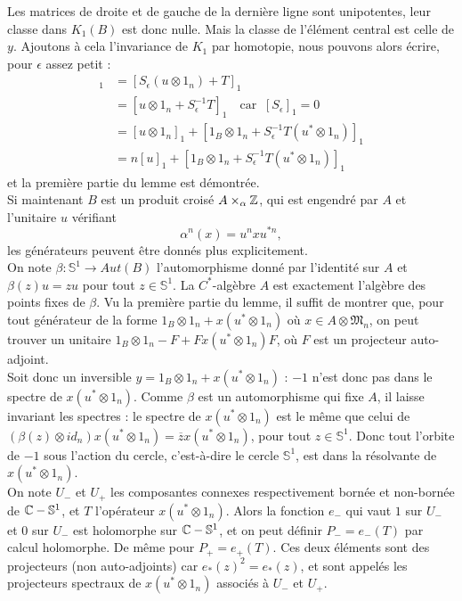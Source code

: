 \begin{dem}
Les matrices de droite et de gauche de la dernière ligne sont unipotentes, leur classe dans $K_1(B)$ est donc nulle. Mais la classe de l'élément central est celle de $y$. Ajoutons à cela l'invariance de $K_1$ par homotopie, nous pouvons alors écrire, pour $\epsilon$ assez petit :
\begin{align*}[y]_1 & =[S_\epsilon(u\otimes 1_n)+T]_1
	\\		&= [u\otimes 1_n +S_\epsilon^{-1}T]_1 \quad \text{car } \ [S_\epsilon]_1=0	
	\\ 		&=[u\otimes 1_n]_1+[1_B\otimes 1_n +S_\epsilon^{-1}T(u^*\otimes 1_n)]_1
	\\		&=n[u]_1+[1_B\otimes 1_n +S_\epsilon^{-1}T(u^*\otimes 1_n)]_1
\end{align*}
et la première partie du lemme est démontrée.\\

Si maintenant $B$ est un produit croisé $A\times_\alpha \mathbb Z$, qui est engendré par $A$ et l'unitaire $u$ vérifiant 
\[\alpha^n(x)=u^n x u^{*n},\]
les générateurs peuvent être donnés plus explicitement.\\

On note $\beta : \mathbb S^1 \rightarrow  Aut(B)$ l'automorphisme donné par l'identité sur $A$ et $\beta(z)u=zu$ pour tout $z\in \mathbb S^1$. La $C^*$-algèbre $A$ est exactement l'algèbre des points fixes de $\beta$. Vu la première partie du lemme, il suffit de montrer que, pour tout générateur de la forme $1_B\otimes 1_n +x(u^*\otimes 1_n)$ où $x\in A\otimes\mathfrak M_n$, on peut trouver un unitaire $1_B\otimes 1_n-F+Fx(u^*\otimes 1_n)F$, où $F$ est un projecteur auto-adjoint.\\

Soit donc un inversible $y=1_B\otimes 1_n +x(u^*\otimes 1_n)$ : $-1$ n'est donc pas dans le spectre de $x(u^*\otimes 1_n)$. Comme $\beta$ est un automorphisme qui fixe $A$, il laisse invariant les spectres : le spectre de $x(u^*\otimes 1_n)$ est le même que celui de $(\beta(z)\otimes id_n)x(u^*\otimes 1_n)=\overline z x(u^*\otimes 1_n)$, pour tout $z\in \mathbb S^1$. Donc tout l'orbite de $-1$ sous l'action du cercle, c'est-à-dire le cercle $\mathbb S^1$, est dans la résolvante de $x(u^*\otimes 1_n)$.\\

On note $U_-$ et $U_+$ les composantes connexes respectivement bornée et non-bornée de $\mathbb C - \mathbb S^1$, et $T$ l'opérateur $x(u^*\otimes 1_n)$. Alors la fonction $e_-$ qui vaut $1$ sur $U_-$ et $0$ sur $U_-$ est holomorphe sur $\mathbb C - \mathbb S^1$, et on peut définir $P_-=e_-(T)$ par calcul holomorphe. De même pour $P_+=e_+(T)$. Ces deux éléments sont des projecteurs (non auto-adjoints) car $e_*(z)^2=e_*(z)$, et sont appelés les projecteurs spectraux de $x(u^*\otimes 1_n)$ associés à $U_-$ et $U_+$.\\


\end{dem}
